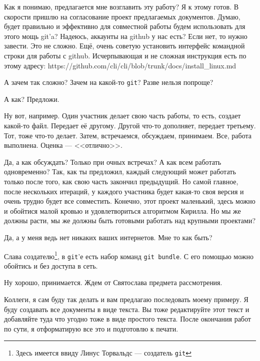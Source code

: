 \documentclass[14pt,a4paper]{article}
\begin{document}
 Как я понимаю, предлагается мне возглавить эту работу? Я к этому готов. В скорости
пришлю на согласование проект предлагаемых документов. Думаю, будет правильно и эффективно
для совместной работы будем использовать для этого мощь git'a? Надеюсь, аккаунты на github у нас есть?
Если нет, то нужно завести. Это не сложно. Ещё, очень советую установить интерфейс командной
строки для работы с github. Исчерпывающая и не сложная инструкция есть по этому адресу:
https://github.com/cli/cli/blob/trunk/docs/install\_linux.md

 А зачем так сложно? Зачем на какой-то \texttt{git}? Разве нельзя попроще?

 А как? Предложи.

 Ну вот, например. Один участник делает свою часть работы, то есть, создает какой-то файл.
Передает её другому. Другой что-то дополняет, передает третьему. Тот, тоже что-то делает. Затем,
встречаемся, обсуждаем, принимаем. Все, работа выполнена. Оценка --- <<отлично>>.

 Да, а как обсуждать? Только при очных встречах? А как всем работать одновременно? Так, 
как ты предложил, каждый следующий может работать только после того, как свою часть закончил предыдущий.
Но самой главное, после нескольких итераций, у каждого участника будет какая-то своя версия и очень трудно
будет все совместить. Конечно, этот проект маленький, здесь можно и обойтися малой кровью и удовлетвориться
алгоритмом Кирилла. Но мы же должны расти, мы же должны быть готовыми работать над  крупными проектами?

 Да, а у меня ведь нет никаких ваших интернетов. Мне то как быть?

 Слава создателю\footnote{Здесь имеется ввиду Линус Торвальдс --- создатель 
\texttt{git}}, в \texttt{git}'е есть набор команд \texttt{git bundle}. С его помощью можно обойтись 
и без доступа в сеть. 

 Ну хорошо, принимается. Ждем от Святослава предмета рассмотрения. 

 Коллеги, я сам буду так делать и вам предлагаю последовать моему примеру. Я буду
создавать все документы в виде текста. Вы тоже редактируйте этот текст и добавляйте туда что угодно
тоже в виде простого текста. После окончания работ по сути, я отформатирую все это и подготовлю к 
печати. 
\end{document}
